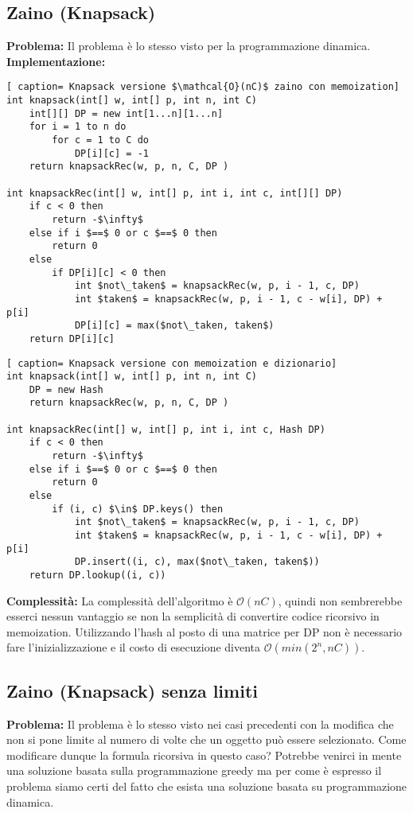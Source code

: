 \documentclass[../cheatSheetAlgoritmi.tex]{subfiles}
\begin{document}
\subsection{Zaino (Knapsack)}
\textbf{Problema:} Il problema è lo stesso visto per la programmazione dinamica. \\
\textbf{Implementazione:}
\begin{lstlisting}[ caption= Knapsack versione $\mathcal{O}(nC)$ zaino con memoization]
int knapsack(int[] w, int[] p, int n, int C)
	int[][] DP = new int[1...n][1...n]
	for i = 1 to n do
		for c = 1 to C do
			DP[i][c] = -1
	return knapsackRec(w, p, n, C, DP )
	
int knapsackRec(int[] w, int[] p, int i, int c, int[][] DP)
	if c < 0 then
		return -$\infty$
	else if i $==$ 0 or c $==$ 0 then
		return 0
	else 
		if DP[i][c] < 0 then 
			int $not\_taken$ = knapsackRec(w, p, i - 1, c, DP)
			int $taken$ = knapsackRec(w, p, i - 1, c - w[i], DP) + p[i]
			DP[i][c] = max($not\_taken, taken$)
	return DP[i][c]
\end{lstlisting}
\begin{lstlisting}[ caption= Knapsack versione con memoization e dizionario]
int knapsack(int[] w, int[] p, int n, int C)
	DP = new Hash
	return knapsackRec(w, p, n, C, DP )
	
int knapsackRec(int[] w, int[] p, int i, int c, Hash DP)
	if c < 0 then
		return -$\infty$
	else if i $==$ 0 or c $==$ 0 then
		return 0
	else 
		if (i, c) $\in$ DP.keys() then 
			int $not\_taken$ = knapsackRec(w, p, i - 1, c, DP)
			int $taken$ = knapsackRec(w, p, i - 1, c - w[i], DP) + p[i]
			DP.insert((i, c), max($not\_taken, taken$))
	return DP.lookup((i, c))
\end{lstlisting}
\textbf{Complessità:} La complessità dell'algoritmo è $\mathcal{O}(nC)$, quindi non sembrerebbe esserci nessun vantaggio se non la semplicità di convertire codice ricorsivo in memoization. Utilizzando l'hash al posto di una matrice per DP non è necessario fare l'inizializzazione e il costo di esecuzione diventa $\mathcal{O}( min (2^{n}, nC))$.
\newpage
\subsection{Zaino (Knapsack) senza limiti}
\textbf{Problema:} Il problema è lo stesso visto nei casi precedenti con la modifica che non si pone limite al numero di volte che un oggetto può essere selezionato. Come modificare dunque la formula ricorsiva in questo caso? Potrebbe venirci in mente una soluzione basata sulla programmazione greedy ma per come è espresso il problema siamo certi del fatto che esista una soluzione basata su programmazione dinamica.
\end{document}
